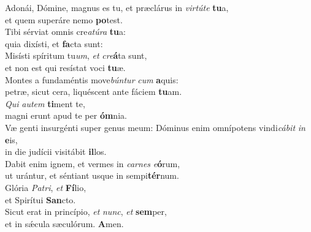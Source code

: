 \evenverse Adonái, Dómine, magnus es tu, et præclárus in \textit{vir}\textit{tú}\textit{te} \textbf{tu}a,~\*\\
\evenverse et quem superáre nemo \textbf{po}test.\\
\oddverse Tibi sérviat omnis cre\textit{a}\textit{tú}\textit{ra} \textbf{tu}a:~\*\\
\oddverse quia dixísti, et \textbf{fa}cta sunt:\\
\evenverse Misísti spíritum tu\textit{um}, \textit{et} \textit{cre}\textbf{á}ta sunt,~\*\\
\evenverse et non est qui resístat voci \textbf{tu}æ.\\
\oddverse Montes a fundaméntis move\textit{bún}\textit{tur} \textit{cum} \textbf{a}quis:~\*\\
\oddverse petræ, sicut cera, liquéscent ante fáciem \textbf{tu}am.\\
\evenverse \textit{Qui} \textit{au}\textit{tem} \textbf{ti}ment te,~\*\\
\evenverse magni erunt apud te per \textbf{óm}nia.\\
\oddverse Væ genti insurgénti super genus meum: Dóminus enim omnípotens vindi\textit{cá}\textit{bit} \textit{in} \textbf{e}is,~\*\\
\oddverse in die judícii visitábit \textbf{il}los.\\
\evenverse Dabit enim ignem, et vermes in \textit{car}\textit{nes} \textit{e}\textbf{ó}rum,~\*\\
\evenverse ut urántur, et séntiant usque in sempi\textbf{tér}num.\\
\oddverse Glória \textit{Pa}\textit{tri}, \textit{et} \textbf{Fí}lio,~\*\\
\oddverse et Spirítui \textbf{San}cto.\\
\evenverse Sicut erat in princípio, \textit{et} \textit{nunc}, \textit{et} \textbf{sem}per,~\*\\
\evenverse et in sǽcula sæculórum. \textbf{A}men.\\
